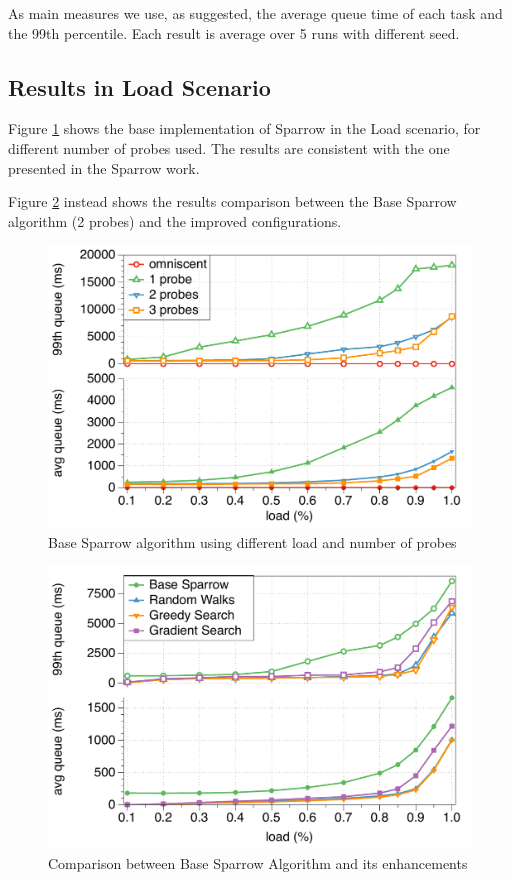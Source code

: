 \documentclass[conference]{IEEEtran}
\begin{document}
  As main measures we use, as suggested, the average queue time of each
  task and the 99th percentile.  Each result is average over 5 runs with
  different seed.

\subsection{Results in Load Scenario}

Figure \ref{fig:probes} shows the base implementation of Sparrow in the Load scenario, for different number of probes used. The results are consistent with the one presented in the Sparrow work.

Figure \ref{fig:comparison} instead shows the results comparison between the Base Sparrow algorithm (2 probes) and the improved configurations.

\begin{figure}
\begin{center}
\includegraphics[scale=0.5]{figures/probes_new}
\caption{Base Sparrow algorithm using different load and number of probes}
\label{fig:probes}
\end{center}
\end{figure}

\begin{figure}
\begin{center}
\includegraphics[scale=0.5]{figures/comparison_new}
\caption{Comparison between Base Sparrow Algorithm and its enhancements}
\label{fig:comparison}
\end{center}
\end{figure}
\end{document}
